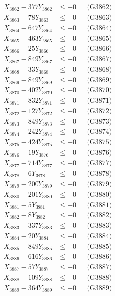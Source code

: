 \documentclass[a4paper,10pt]{article}
\begin{document}
{\begin{align}
X_{3862} - 377Y_{3862} &\leq +0 && \text{(G3862)} \\
X_{3863} - 78Y_{3863} &\leq +0 && \text{(G3863)} \\
X_{3864} - 647Y_{3864} &\leq +0 && \text{(G3864)} \\
X_{3865} - 463Y_{3865} &\leq +0 && \text{(G3865)} \\
X_{3866} - 25Y_{3866} &\leq +0 && \text{(G3866)} \\
X_{3867} - 849Y_{3867} &\leq +0 && \text{(G3867)} \\
X_{3868} - 33Y_{3868} &\leq +0 && \text{(G3868)} \\
X_{3869} - 849Y_{3869} &\leq +0 && \text{(G3869)} \\
X_{3870} - 402Y_{3870} &\leq +0 && \text{(G3870)} \\
\allowbreak
X_{3871} - 832Y_{3871} &\leq +0 && \text{(G3871)} \\
X_{3872} - 127Y_{3872} &\leq +0 && \text{(G3872)} \\
X_{3873} - 849Y_{3873} &\leq +0 && \text{(G3873)} \\
X_{3874} - 242Y_{3874} &\leq +0 && \text{(G3874)} \\
X_{3875} - 424Y_{3875} &\leq +0 && \text{(G3875)} \\
X_{3876} - 19Y_{3876} &\leq +0 && \text{(G3876)} \\
X_{3877} - 714Y_{3877} &\leq +0 && \text{(G3877)} \\
X_{3878} - 6Y_{3878} &\leq +0 && \text{(G3878)} \\
X_{3879} - 200Y_{3879} &\leq +0 && \text{(G3879)} \\
X_{3880} - 201Y_{3880} &\leq +0 && \text{(G3880)} \\
\allowbreak
X_{3881} - 5Y_{3881} &\leq +0 && \text{(G3881)} \\
X_{3882} - 8Y_{3882} &\leq +0 && \text{(G3882)} \\
X_{3883} - 337Y_{3883} &\leq +0 && \text{(G3883)} \\
X_{3884} - 20Y_{3884} &\leq +0 && \text{(G3884)} \\
X_{3885} - 849Y_{3885} &\leq +0 && \text{(G3885)} \\
X_{3886} - 616Y_{3886} &\leq +0 && \text{(G3886)} \\
X_{3887} - 57Y_{3887} &\leq +0 && \text{(G3887)} \\
X_{3888} - 109Y_{3888} &\leq +0 && \text{(G3888)} \\
X_{3889} - 364Y_{3889} &\leq +0 && \text{(G3889)} \\

\end{align}}
\end{document}
